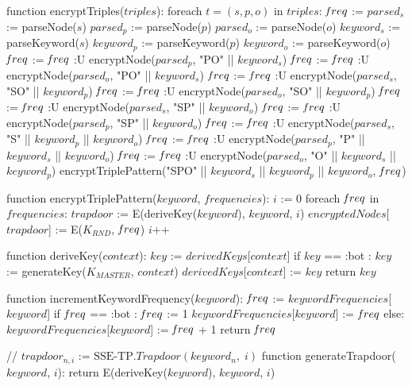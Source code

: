 function encryptTriples($triples$):
	foreach $t = (s,p,o)$ in $triples$:
        $\textrm{\emph{f}}req$ := {}
        $parsed_s$ := parseNode($s$)
        $parsed_p$ := parseNode($p$)
        $parsed_o$ := parseNode($o$)
        $keyword_s$ := parseKeyword($s$)
        $keyword_p$ := parseKeyword($p$)
        $keyword_o$ := parseKeyword($o$)
        $\textrm{\emph{f}}req$ := $\textrm{\emph{f}}req$ :U { encryptNode($parsed_p$, "PO" || $keyword_s$) }
        $\textrm{\emph{f}}req$ := $\textrm{\emph{f}}req$ :U { encryptNode($parsed_o$, "PO" || $keyword_s$) }
        $\textrm{\emph{f}}req$ := $\textrm{\emph{f}}req$ :U { encryptNode($parsed_s$, "SO" || $keyword_p$) }
        $\textrm{\emph{f}}req$ := $\textrm{\emph{f}}req$ :U { encryptNode($parsed_o$, "SO" || $keyword_p$) }
        $\textrm{\emph{f}}req$ := $\textrm{\emph{f}}req$ :U { encryptNode($parsed_s$, "SP" || $keyword_o$) }
        $\textrm{\emph{f}}req$ := $\textrm{\emph{f}}req$ :U { encryptNode($parsed_p$, "SP" || $keyword_o$) }
        $\textrm{\emph{f}}req$ := $\textrm{\emph{f}}req$ :U { encryptNode($parsed_s$, "S" || $keyword_p$ || $keyword_o$) }
        $\textrm{\emph{f}}req$ := $\textrm{\emph{f}}req$ :U { encryptNode($parsed_p$, "P" || $keyword_s$ || $keyword_o$) }
        $\textrm{\emph{f}}req$ := $\textrm{\emph{f}}req$ :U { encryptNode($parsed_o$, "O" || $keyword_s$ || $keyword_p$) }
        encryptTriplePattern("SPO" || $keyword_s$ || $keyword_p$ || $keyword_o$, $\textrm{\emph{f}}req$)
 
function encryptTriplePattern($keyword$, $frequencies$): 
    $i$ := 0
    foreach $\textrm{\emph{f}}req$ in $frequencies$:
        $trapdoor$ := E(deriveKey($keyword$), $keyword$, $i$)
        $encryptedNodes$[$trapdoor$] := E($K_{RND}$, $\textrm{\emph{f}}req$)
        $i$++

function deriveKey($context$):
    $key$ := $derivedKeys$[$context$]
    if $key$ == :bot :
        $key$ := generateKey($K_{MASTER}$, $context$)
        $derivedKeys$[$context$] := $key$
    return $key$

function incrementKeywordFrequency($keyword$):
    $\textrm{\emph{f}}req$ := $keywordFrequencies$[$keyword$]
    if $\textrm{\emph{f}}req$ == :bot :
        $\textrm{\emph{f}}req$ := 1
        $keywordFrequencies$[$keyword$] := $\textrm{\emph{f}}req$
    else:
        $keywordFrequencies$[$keyword$] := $\textrm{\emph{f}}req$ + 1
    return $\textrm{\emph{f}}req$

// $trapdoor_{n,i}$ := $\textrm{SSE-TP}.Trapdoor(keyword_n, \; i)$
function generateTrapdoor($keyword$, $i$):
    return E(deriveKey($keyword$), $keyword$, $i$)
    
